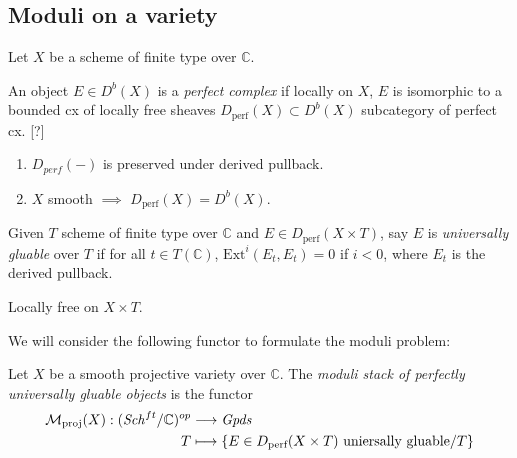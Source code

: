 \subsection{Moduli on a variety}
\label{subsection-moduli-on-a-variety}

Let $X$ be a scheme of finite type over
$\mathbb{C}$.

\begin{definition}
\label{definition-perfect-complex}
An object $E \in D^b(X)$ is a {\it perfect
complex} if locally on $X$, $E$ is isomorphic
to a bounded cx of locally free sheaves
$D_{\text{perf}}(X)\subset D^b(X)$
subcategory of perfect cx. [?]
\end{definition}

\begin{remark}
\label{remark-perfect}
\begin{enumerate}
\item $D_{perf}(-)$ is preserved under
derived pullback.
\item $X$ smooth $\implies$
$D_{\text{perf}}(X)=D^b(X)$.
\end{enumerate}
\end{remark}

\begin{definition}
\label{definition-universally-gluable}
Given $T$ scheme of finite type over
$\mathbb{C}$ and $E \in
D_{\text{perf}}(X\times T)$, say $E$ is {\it
universally gluable} over $T$ if for all $t
\in T(\mathbb{C})$, $\text{Ext}^i(E_t,E_t)=0$
if $i<0$, where  $E_t$ is the derived
pullback.
\end{definition}

\begin{example}
\label{example-locally-free}
Locally free on $X \times T$.
\end{example}

We will consider the following functor to
formulate the moduli problem:

\begin{definition}
\label{nasak-label-006}
Let $X$ be a smooth projective variety over
$\mathbb{C}$. The {\it moduli stack of
perfectly universally gluable objects} is the
functor
$$
\begin{aligned}
\mathcal{M}_{\text{proj}}(X):
(\mathit{Sch}^{ft}/\mathbb{C})^{op}
&\longrightarrow \mathit{Gpds} \\
T &\longmapsto  \{E \in
D_{\text{perf}}(X\times T)\text{ uniersally
gluable}/T\}
\end{aligned}
$$

\end{definition}

